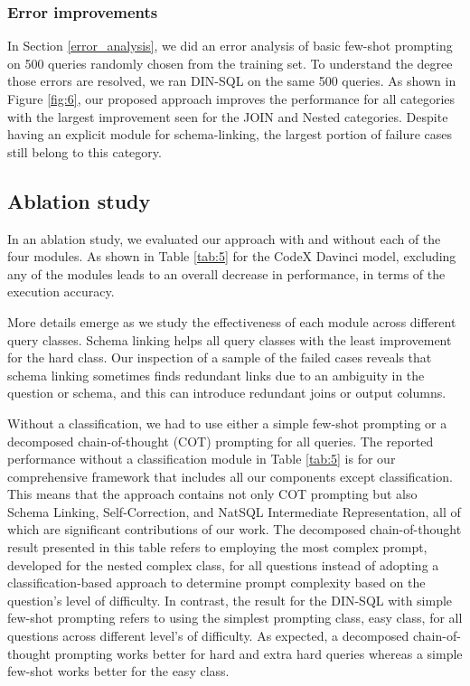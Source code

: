 \subsubsection{Error improvements}
In Section \ref{error_analysis}, we did an error analysis of basic few-shot prompting on 500 queries randomly chosen from the training set. To understand the degree those errors are resolved, we ran DIN-SQL on the same 500 queries. As shown in Figure \ref{fig:6}, our proposed approach improves the performance for all categories with the largest improvement seen for the JOIN and Nested categories. Despite having an explicit module for schema-linking, the largest portion of failure cases still belong to this category.
\subsection{Ablation study}

In an ablation study, we evaluated our approach with and without each of the four modules. As shown in Table \ref{tab:5} for the CodeX Davinci model, excluding any of the modules leads to an overall decrease in performance, in terms of the execution accuracy.

More details emerge as we study the effectiveness of each module across different query classes. Schema linking helps all query classes with the least improvement for the hard class. Our inspection of a sample of the failed cases reveals that schema linking sometimes finds redundant links due to an ambiguity in the question or schema, and this can introduce redundant joins or output columns.

Without a classification, we had to use either a simple few-shot prompting or a decomposed chain-of-thought (COT) prompting for all queries. The reported performance without a classification module in Table \ref{tab:5} is for our comprehensive framework that includes all our components except classification. This means that the approach contains not only COT prompting but also Schema Linking, Self-Correction, and NatSQL Intermediate Representation, all of which are significant contributions of our work. The decomposed chain-of-thought result presented in this table refers to employing the most complex prompt, developed for the nested complex class, for all questions instead of adopting a classification-based approach to determine prompt complexity based on the question's level of difficulty. In contrast, the result for the DIN-SQL with simple few-shot prompting refers to using the simplest prompting class, easy class, for all questions across different level's of difficulty. As expected, a decomposed chain-of-thought prompting works better for hard and extra hard queries whereas a simple few-shot works better for the easy class.

